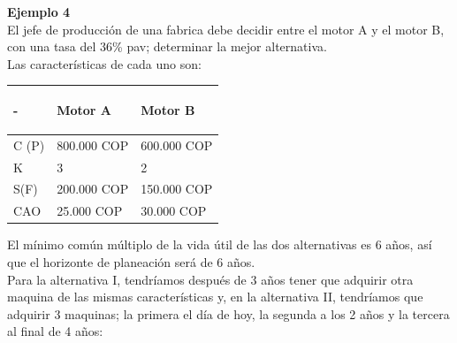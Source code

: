 \textbf{Ejemplo 4}\\
El jefe de producción de una fabrica debe decidir entre el motor A y el motor B, con una tasa del 36\% pav; determinar la mejor alternativa.\\

Las características de cada uno son:

\begin{center}
	\begin{tabular}{ |p{4cm}|p{4cm}| p{4cm}|}
		\hline
		\begin{center}\textbf{-} \end{center} & \begin{center} \textbf{Motor A}\end{center} & \begin{center} \textbf{Motor B} \end{center} \\ \hline
		C (P)                         & 800.000 COP                 & 600.000 COP                  \\ \hline
		K                          & 3                          & 2                          		\\  \hline
		S(F)                          & 200.000 COP                  & 150.000 COP                 \\ \hline
		CAO                        & 25.000 COP                   & 30.000 COP                   \\ \hline
	\end{tabular}
\end{center}
El mínimo común múltiplo de la vida útil de las dos alternativas es 6 años, así que el horizonte de planeación será de 6 años.\\
Para la alternativa I, tendríamos después de 3 años tener que adquirir otra maquina de las mismas características y, en la alternativa II, tendríamos que adquirir 3 maquinas; la primera el día de hoy, la segunda a los 2 años y la tercera al final de 4 años:
\\



